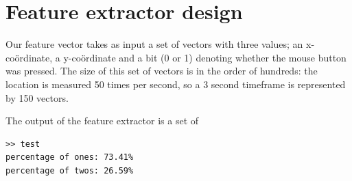 \section{Feature extractor design}
Our feature vector takes as input a set of vectors with three values; an x-co\"ordinate, a y-co\"ordinate and a bit (0 or 1) denoting whether the mouse button was pressed. The size of this set of vectors is in the order of hundreds: the location is measured 50 times per second, so a 3 second timeframe is represented by 150 vectors.

The output of the feature extractor is a set of 

\begin{verbatim}
>> test
percentage of ones: 73.41%
percentage of twos: 26.59%
\end{verbatim}


